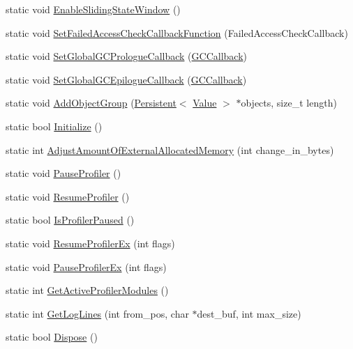 \begin{DoxyCompactItemize}
\item 
static void \hyperlink{classv8_1_1_v8_aa91df5fe1bb98b87952ef4bbf0aceb96}{Enable\+Sliding\+State\+Window} ()
\item 
static void \hyperlink{classv8_1_1_v8_aa6ed646d43360c209881871b3ac747aa}{Set\+Failed\+Access\+Check\+Callback\+Function} (Failed\+Access\+Check\+Callback)
\item 
static void \hyperlink{classv8_1_1_v8_a503e14a77e922775bd88bc2e19e19886}{Set\+Global\+G\+C\+Prologue\+Callback} (\hyperlink{namespacev8_a226458957ce3c253b9a9f539bb5ddad4}{G\+C\+Callback})
\item 
static void \hyperlink{classv8_1_1_v8_a94bac5e06a99141c5629842e18558cfe}{Set\+Global\+G\+C\+Epilogue\+Callback} (\hyperlink{namespacev8_a226458957ce3c253b9a9f539bb5ddad4}{G\+C\+Callback})
\item 
static void \hyperlink{classv8_1_1_v8_a4744037e970e3b3bafcc3cac03a5967f}{Add\+Object\+Group} (\hyperlink{classv8_1_1_persistent}{Persistent}$<$ \hyperlink{classv8_1_1_value}{Value} $>$ $\ast$objects, size\+\_\+t length)
\item 
static bool \hyperlink{classv8_1_1_v8_a40daec93ce44bdd922567fc121be9db8}{Initialize} ()
\item 
static int \hyperlink{classv8_1_1_v8_a8e6f2e66c028d1ffa3f5e8a799790bc5}{Adjust\+Amount\+Of\+External\+Allocated\+Memory} (int change\+\_\+in\+\_\+bytes)
\item 
static void \hyperlink{classv8_1_1_v8_a5fefebea0cd37105837a9d267baf2e5c}{Pause\+Profiler} ()
\item 
static void \hyperlink{classv8_1_1_v8_ab0557aaba62c7fb253fe838003aa60af}{Resume\+Profiler} ()
\item 
static bool \hyperlink{classv8_1_1_v8_aa8dc5a7c3a059bb376882ac36b9df775}{Is\+Profiler\+Paused} ()
\item 
static void \hyperlink{classv8_1_1_v8_aac4620dd3e4f14dc4683f4cfe3076338}{Resume\+Profiler\+Ex} (int flags)
\item 
static void \hyperlink{classv8_1_1_v8_aca6135fcc429cd8340630a95e08f223a}{Pause\+Profiler\+Ex} (int flags)
\item 
static int \hyperlink{classv8_1_1_v8_a94e8ce52e976b58d5cbdb23d2abe894e}{Get\+Active\+Profiler\+Modules} ()
\item 
static int \hyperlink{classv8_1_1_v8_ac7e91e25ed7773db1f31413fb726bca7}{Get\+Log\+Lines} (int from\+\_\+pos, char $\ast$dest\+\_\+buf, int max\+\_\+size)
\item 
static bool \hyperlink{classv8_1_1_v8_a566450d632c0a63770682b9da3cae08d}{Dispose} ()
\end{DoxyCompactItemize}

